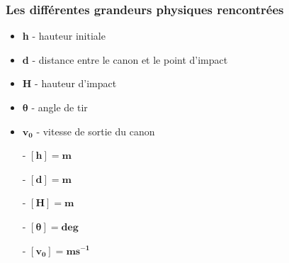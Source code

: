 \documentclass[12pt,a4paper]{article}
\begin{document}
    \subsubsection{Les différentes grandeurs physiques rencontrées}
    \begin{minipage}{0.6\linewidth}
        \begin{itemize}
            \item \textbf{h} - hauteur initiale 
            \item \textbf{d} - distance entre le canon et le point d'impact 
            \item \textbf{H} - hauteur d'impact
            \item $\bm{\theta}$ - angle de tir 
            \item $\bm{v_0}$ - vitesse de sortie du canon
        \end{itemize}
    \end{minipage}%
    \hfill
    \begin{minipage}{0.4\linewidth}
        \begin{itemize}
            \item[-] $\bm{[h]=m}$
            \item[-] $\bm{[d]=m}$
            \item[-] $\bm{[H]=m}$
            \item[-] $\bm{[\theta]=deg}$
            \item[-] $\bm{[v_0]=ms^{-1}}$
        \end{itemize}   
    \end{minipage}
\end{document}
